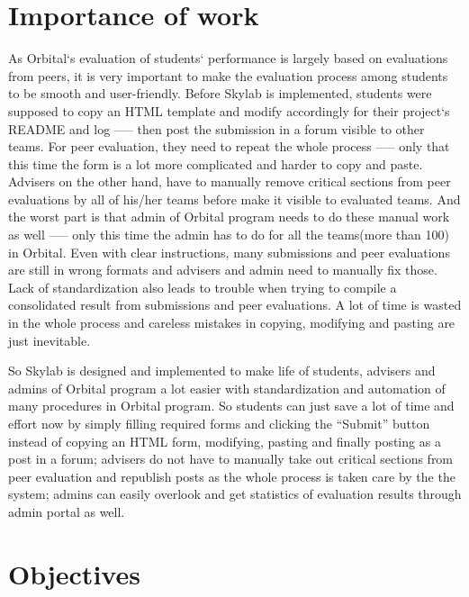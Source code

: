 \section{Importance of work}

As Orbital`s evaluation of students` performance is largely based on evaluations from peers, it is very important to make the evaluation process among students to be smooth and user-friendly. Before Skylab is implemented, students were supposed to copy an HTML template and modify accordingly for their project`s README and log —-- then post the submission in a forum visible to other teams. For peer evaluation, they need to repeat the whole process —-- only that this time the form is a lot more complicated and harder to copy and paste. Advisers on the other hand, have to manually remove critical sections from peer evaluations by all of his/her teams before make it visible to evaluated teams. And the worst part is that admin of Orbital program needs to do these manual work as well —-- only this time the admin has to do for all the teams(more than 100) in Orbital. Even with clear instructions, many submissions and peer evaluations are still in wrong formats and advisers and admin need to manually fix those. Lack of standardization also leads to trouble when trying to compile a consolidated result from submissions and peer evaluations. A lot of time is wasted in the whole process and careless mistakes in copying, modifying and pasting are just inevitable. 

So Skylab is designed and implemented to make life of students, advisers and admins of Orbital program a lot easier with standardization and automation of many procedures in Orbital program. So students can just save a lot of time and effort now by simply filling required forms and clicking the ``Submit'' button instead of copying an HTML form, modifying, pasting and finally posting as a post in a forum; advisers do not have to manually take out critical sections from peer evaluation and republish posts as the whole process is taken care by the the system; admins can easily overlook and get statistics of evaluation results through admin portal as well.

\section{Objectives}

